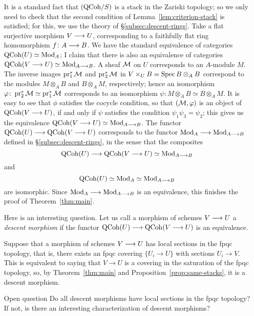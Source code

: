 \begin{4   STACKS}
\begin{4.2 Descent for quasi-coherent sheaves}
It is a standard fact that $({\mathrm{QCoh}/S})$ is a stack in the Zariski topology; so we only need to check that the second condition of Lemma~\ref{lem:criterion-stack} is satisfied; for this, we use the theory of \S\ref{subsec:descent-rings}. Take a flat surjective morphism $V \arr U$, corresponding to a faithfully flat ring homomorphism $f \colon A \arr B$. We have the standard equivalence of categories $\operatorname{QCoh}(U) \simeq \mathrm{Mod}_{A}$; I claim that there is also an equivalence of categories $\qcoh{V \arr U} \simeq \catmod{A \arr B}$. A \qc sheaf $\mathcal{M}$ on $U$ corresponds to an $A$-module $M$. The inverse images $\operatorname{pr}_1^* \mathcal{M}$ and  $\operatorname{pr}_2^* \mathcal{M}$ in $V \times_U B = \operatorname{Spec} B \otimes_A B$ correspond to the modules $M \otimes_A B$ and $B \otimes_A M$, respectively; hence an isomorphism $\varphi\colon \operatorname{pr}_2^* \mathcal{M} \simeq \operatorname{pr}_1^* \mathcal{M}$ corresponds to an isomorphism $\psi \colon M \otimes_A B \simeq B \otimes_A M$. It is easy to see that $\phi$ satisfies the cocycle condition, so that $(\mathcal{M}, \varphi)$ is an object of $\qcoh{V\arr U}$, if and only if $\psi$ satisfies the condition $\psi_1\psi_3 = \psi_2$; this gives us the equivalence $\qcoh{V \arr U} \simeq \catmod{A \arr B}$. The functor $\qcoh U \arr \qcoh{V \arr U}$ corresponds to the functor $\catmod{A} \arr \catmod{A \arr B}$ defined in \S\ref{subsec:descent-rings}, in the sense that the composites
   \[
   \qcoh U \arr \qcoh{V \arr U} \simeq \catmod{A \arr B}
   \]
and
   \[
   \qcoh U \simeq \catmod{A} \simeq \catmod{A \arr B}
   \]
are isomorphic. Since $\catmod{A} \arr \catmod{A \arr B}$ is an equivalence, this finishes the proof of Theorem~\ref{thm:main}.

Here is an interesting question. Let us call a morphism of schemes $V \arr U$ a  \emph{descent morphism}%
 if the functor $\qcoh{U} \arr \qcoh{V \to U}$ is an equivalence.

Suppose that a morphism of schemes $V \arr U$ has local sections in the fpqc topology, that is, there exists an fpqc covering $\{U_{i} \to U\}$ with sections $U_{i} \to V$. This is equivalent to saying that $V \to U$ is a covering in the saturation of the fpqc topology, so, by Theorem~\ref{thm:main} and Proposition~\ref{prop:same-stacks}, it is a descent morphism.

\begin{namedr}{Open question}
Do all descent morphisms have local sections in the fpqc topology? If not, is there an interesting characterization of descent morphisms?
\end{namedr}



\end{4.2 Descent for quasi-coherent sheaves}
\end{4   STACKS}

